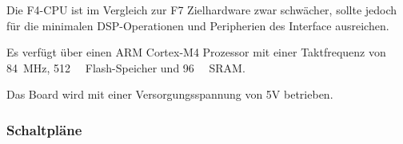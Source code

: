 Die F4-CPU ist im Vergleich zur F7 Zielhardware zwar schwächer, sollte jedoch für die minimalen DSP-Operationen und Peripherien des Interface ausreichen.

Es verfügt über einen ARM Cortex-M4 Prozessor mit einer Taktfrequenz von \SI{84}{\mega\hertz}, \SI{512}{\kilo\byte} Flash-Speicher und \SI{96}{\kilo\byte} SRAM.

Das Board wird mit einer Versorgungsspannung von 5V betrieben. \cite{nucleo-f401re}

\vspace{4em}





\newpage
\subsubsection{Schaltpläne}
\label{sec:test-schematics}


\begin{figure}[ht]
	\centering
	
	\label{fig:audio_test_schematic}
\end{figure}

\newpage
\begin{figure}[ht]
	\centering
	
	\label{fig:interface_test_schematic}
\end{figure}